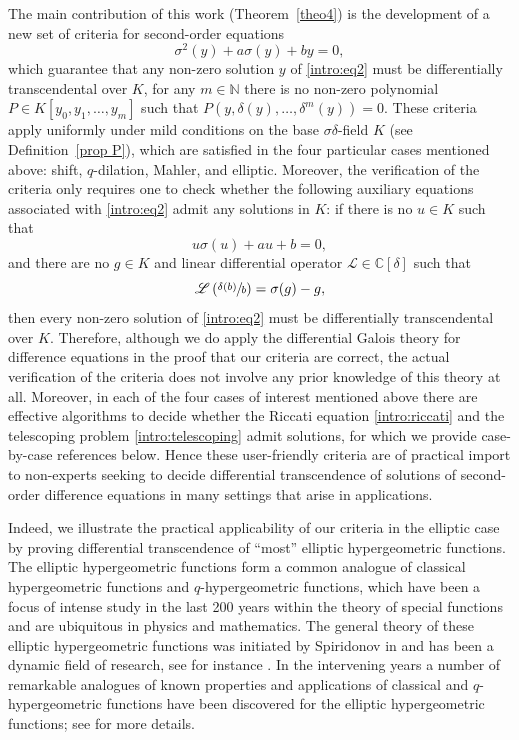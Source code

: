 \documentclass[10pt]{amsart}
\let\mathcal\mathscr
\theoremstyle{definition}
\begin{document}
The main contribution of this work (Theorem~\ref{theo4}) is the development of a new set of criteria for second-order equations
\begin{equation}\label{intro:eq2} \sigma^2(y)+a\sigma(y)+by=0,\end{equation}
which guarantee that any non-zero solution $y$ of \eqref{intro:eq2} must be differentially transcendental over $K$, \ie for any $m\in\mathbb{N}$ there is no non-zero polynomial $P\in K[y_0,y_1,\dots,y_m]$ such that $P(y,\delta(y),\dots,\delta^m(y))=0$. These criteria apply uniformly under mild conditions on the base $\sigma\delta$-field $K$ (see Definition~\ref{prop P}), which are satisfied in the four particular cases mentioned above: shift, $q$-dilation, Mahler, and elliptic. Moreover, the verification of the criteria only requires one to check whether the following auxiliary equations associated with \eqref{intro:eq2} admit any solutions in $K$: if there is no $u\in K$ such that
\begin{equation}\label{intro:riccati} u\sigma(u)+au+b=0,
\end{equation}
and there are no $g\in K$ and linear differential operator $\mathcal{L}\in\mathbb{C}[\delta]$ such that
\begin{equation}\label{intro:telescoping} \mathcal{L}\left(\sfrac{\delta(b)}{b}\right)=\sigma(g)-g,
\end{equation}
then every non-zero solution of \eqref{intro:eq2} must be differentially transcendental over $K$. Therefore, although we do apply the differential Galois theory for difference equations \cite{HS} in the proof that our criteria are correct, the actual verification of the criteria does not involve any prior knowledge of this theory at all. Moreover, in each of the four cases of interest mentioned above there are effective algorithms to decide whether the Riccati equation \eqref{intro:riccati} and the telescoping problem \eqref{intro:telescoping} admit solutions, for which we provide case-by-case references below. Hence these user-friendly criteria are of practical import to non-experts seeking to decide differential transcendence of solutions of second-order difference equations in many settings that arise in applications.\enlargethispage{.5\baselineskip}%

Indeed, we illustrate the practical applicability of our criteria in the elliptic case by proving differential transcendence of ``most'' elliptic hypergeometric functions. The elliptic hypergeometric functions form a common analogue of classical hypergeometric functions and $q$-hypergeometric functions, which have been a focus of intense study in the last 200 years within the theory of special functions and are ubiquitous in physics and mathematics. The general theory of these elliptic hypergeometric functions was initiated by Spiridonov in \cite{spiridonov2016elliptic} and has been a dynamic field of research, see for instance \cite{van2007hyperbolic,fokko2009basic,
magnus2009elliptic,rains2010transformations,
rosengren2002elliptic}. In the intervening years a number of remarkable analogues of known properties and applications of classical and $q$-hypergeometric functions have been discovered for the elliptic hypergeometric functions; see \cite{spiridonov2016elliptic} for more details.
\end{document}
